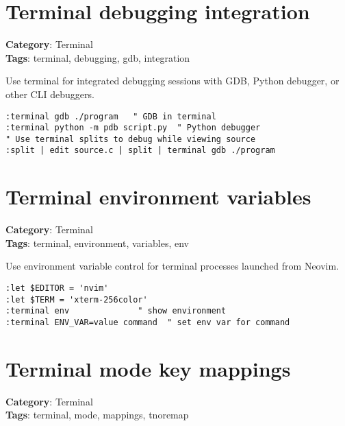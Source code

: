 {{{{{{{{{{\section{Terminal debugging integration}

\textbf{Category}: Terminal\\ \textbf{Tags}: terminal, debugging, gdb, integration
\vspace{0.5cm}

Use terminal for integrated debugging sessions with GDB, Python debugger, or other CLI debuggers.

\begin{Exa*}{}
\begin{Verbatim}[fontsize=\footnotesize, breaklines, breakanywhere]
:terminal gdb ./program   " GDB in terminal
:terminal python -m pdb script.py  " Python debugger
" Use terminal splits to debug while viewing source
:split | edit source.c | split | terminal gdb ./program
\end{Verbatim}
\end{Exa*}

\section{Terminal environment variables}

\textbf{Category}: Terminal\\ \textbf{Tags}: terminal, environment, variables, env
\vspace{0.5cm}

Use environment variable control for terminal processes launched from Neovim.

\begin{Exa*}{}
\begin{Verbatim}[fontsize=\footnotesize, breaklines, breakanywhere]
:let $EDITOR = 'nvim'
:let $TERM = 'xterm-256color'
:terminal env              " show environment
:terminal ENV_VAR=value command  " set env var for command
\end{Verbatim}
\end{Exa*}

\section{Terminal mode key mappings}

\textbf{Category}: Terminal\\ \textbf{Tags}: terminal, mode, mappings, tnoremap
\vspace{0.5cm}

}}}}}}}}}}
